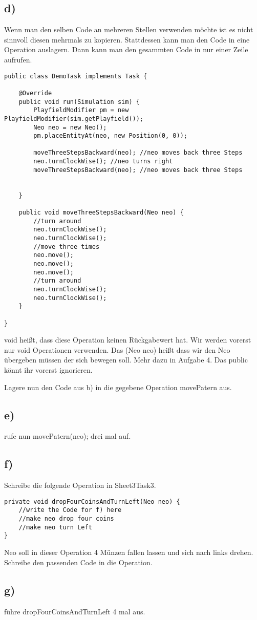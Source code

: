 \subsection*{d)}
	\begin{Infobox}[Operation]
		Wenn man den selben Code an mehreren Stellen verwenden möchte ist es nicht sinnvoll diesen mehrmals zu kopieren. Stattdessen kann man den Code in eine Operation auslagern. Dann kann man den gesammten Code in nur einer Zeile  aufrufen.
				\begin{lstlisting}
public class DemoTask implements Task {
    
    @Override
    public void run(Simulation sim) {
        PlayfieldModifier pm = new PlayfieldModifier(sim.getPlayfield());
        Neo neo = new Neo();
        pm.placeEntityAt(neo, new Position(0, 0));
     
        moveThreeStepsBackward(neo); //neo moves back three Steps
        neo.turnClockWise(); //neo turns right
        moveThreeStepsBackward(neo); //neo moves back three Steps
	
        
    }
    
    public void moveThreeStepsBackward(Neo neo) {
        //turn around
        neo.turnClockWise();
        neo.turnClockWise();
        //move three times
        neo.move();
        neo.move();
        neo.move();
        //turn around
        neo.turnClockWise();
        neo.turnClockWise();
    }
    
}
		\end{lstlisting}
void heißt, dass diese Operation keinen Rückgabewert hat. Wir werden vorerst nur void Operationen verwenden. Das (Neo neo) heißt dass wir den Neo übergeben müssen der sich bewegen soll. Mehr dazu in Aufgabe 4. Das public könnt ihr vorerst ignorieren.
 	\end{Infobox}
Lagere nun den Code aus b) in die gegebene Operation movePatern aus.
\subsection*{e)}
rufe nun movePatern(neo); drei mal auf.
\subsection*{f)}
Schreibe die folgende Operation in Sheet3Task3.
\begin{lstlisting}
private void dropFourCoinsAndTurnLeft(Neo neo) {
    //write the Code for f) here
    //make neo drop four coins
    //make neo turn Left
}
\end{lstlisting}
Neo soll in dieser Operation 4 Münzen fallen lassen und sich nach links drehen. Schreibe den passenden Code in die Operation.
\subsection*{g)}
führe dropFourCoinsAndTurnLeft 4 mal aus.